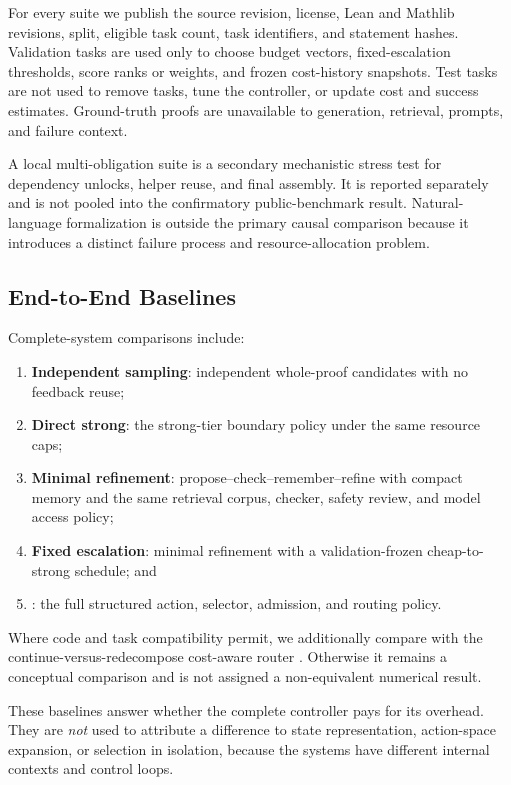 For every suite we publish the source revision, license, Lean and Mathlib
revisions, split, eligible task count, task identifiers, and statement hashes.
Validation tasks are used only to choose budget vectors, fixed-escalation
thresholds, score ranks or weights, and frozen cost-history snapshots. Test
tasks are not used to remove tasks, tune the controller, or update cost and
success estimates. Ground-truth proofs are unavailable to generation,
retrieval, prompts, and failure context.

A local multi-obligation suite is a secondary mechanistic stress test for
dependency unlocks, helper reuse, and final assembly. It is reported separately
and is not pooled into the confirmatory public-benchmark result. Natural-language
formalization is outside the primary causal comparison because it introduces a
distinct failure process and resource-allocation problem.

\subsection{End-to-End Baselines}

Complete-system comparisons include:

\begin{enumerate}
    \item \textbf{Independent sampling}: independent whole-proof candidates
    with no feedback reuse;
    \item \textbf{Direct strong}: the strong-tier boundary policy under the
    same resource caps;
    \item \textbf{Minimal refinement}: propose--check--remember--refine with
    compact memory and the same retrieval corpus, checker, safety review, and
    model access policy;
    \item \textbf{Fixed escalation}: minimal refinement with a
    validation-frozen cheap-to-strong schedule; and
    \item \system: the full structured action, selector, admission, and
    routing policy.
\end{enumerate}

Where code and task compatibility permit, we additionally compare with the
continue-versus-redecompose cost-aware router
\cite{rognvaldsson2026costquality}. Otherwise it remains a conceptual
comparison and is not assigned a non-equivalent numerical result.

These baselines answer whether the complete controller pays for its overhead.
They are \emph{not} used to attribute a difference to state representation,
action-space expansion, or selection in isolation, because the systems have
different internal contexts and control loops.

